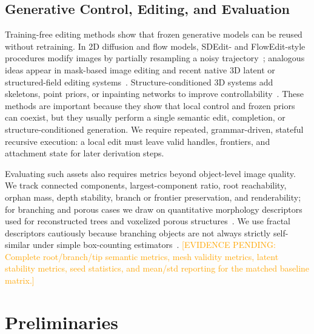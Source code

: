 \documentclass[sigconf,anonymous,review]{acmart}
\providecommand{\EvidencePending}[1]{\textcolor{orange}{[EVIDENCE PENDING: #1]}}
\begin{document}
\subsection{Generative Control, Editing, and Evaluation}
Training-free editing methods show that frozen generative models can be reused without retraining. In 2D diffusion and flow models, SDEdit- and FlowEdit-style procedures modify images by partially resampling a noisy trajectory~\cite{sdeedit2021,flowedit2024}; analogous ideas appear in mask-based image editing and recent native 3D latent or structured-field editing systems~\cite{nano3d2025,voxhammer2025,latte3d2025,inpaintslat2025}. Structure-conditioned 3D systems add skeletons, point priors, or inpainting networks to improve controllability~\cite{skadapter2026,pointsTo3D2026}. These methods are important because they show that local control and frozen priors can coexist, but they usually perform a single semantic edit, completion, or structure-conditioned generation. We require repeated, grammar-driven, stateful recursive execution: a local edit must leave valid handles, frontiers, and attachment state for later derivation steps.

Evaluating such assets also requires metrics beyond object-level image quality. We track connected components, largest-component ratio, root reachability, orphan mass, depth stability, branch or frontier preservation, and renderability; for branching and porous cases we draw on quantitative morphology descriptors used for reconstructed trees and voxelized porous structures~\cite{raumonen2013treeModels,martinez2018minkowskiPorosity}. We use fractal descriptors cautiously because branching objects are not always strictly self-similar under simple box-counting estimators~\cite{cheeseman2022fractalCaution}. \EvidencePending{Complete root/branch/tip semantic metrics, mesh validity metrics, latent stability metrics, seed statistics, and mean/std reporting for the matched baseline matrix.}

\section{Preliminaries}
\end{document}
